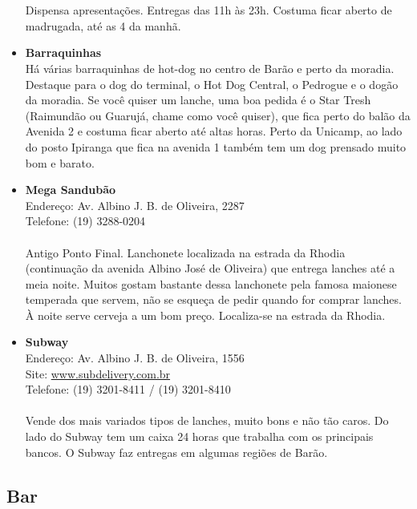 \begin{itemize}
  \\
  \\Dispensa apresentações. Entregas das 11h às 23h. Costuma ficar aberto
  de madrugada, até as 4 da manhã.
\item \textbf{Barraquinhas}
  \\Há várias barraquinhas de hot-dog no centro de Barão e perto da moradia.
  Destaque para o dog do terminal, o Hot Dog Central, o Pedrogue e o dogão da
  moradia. Se você quiser um lanche, uma boa pedida é o Star Tresh (Raimundão
  ou Guarujá, chame como você quiser), que fica perto do balão da Avenida 2 e
  costuma ficar aberto até altas horas. Perto da Unicamp, ao lado do posto
  Ipiranga que fica na avenida 1 também tem um dog prensado muito bom e barato.
\item \textbf{Mega Sandubão}
  \\Endereço: Av. Albino J. B. de Oliveira, 2287
  \\Telefone: (19) 3288-0204
  \\
  \\Antigo Ponto Final. Lanchonete localizada na estrada da Rhodia
  (continuação da avenida Albino José de Oliveira) que entrega lanches até
  a meia noite. Muitos gostam bastante dessa lanchonete pela famosa maionese
  temperada que servem, não se esqueça de pedir quando for comprar lanches. À
  noite serve cerveja a um bom preço. Localiza-se na estrada da Rhodia.
\item \textbf{Subway}
  \\Endereço: Av. Albino J. B. de Oliveira, 1556
  \\Site: \url{www.subdelivery.com.br}
  \\Telefone: (19) 3201-8411 / (19) 3201-8410
  \\
  \\Vende dos mais variados tipos de lanches, muito bons e não tão caros. Do
  lado do Subway tem um caixa 24 horas que trabalha com os principais bancos.
  O Subway faz entregas em algumas regiões de Barão.
\end{itemize}

\subsection{Bar}

